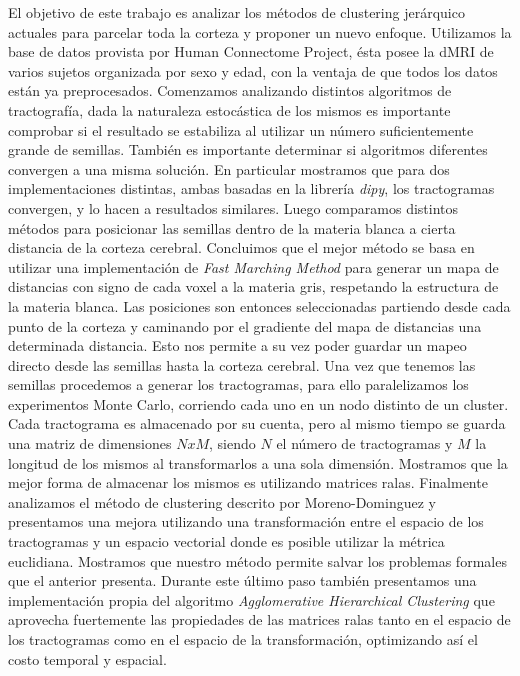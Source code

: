El objetivo de este trabajo es analizar los m\'etodos de clustering jer\'arquico
actuales para parcelar toda la corteza y proponer un nuevo enfoque. Utilizamos
la base de datos provista por Human Connectome Project, \'esta posee la dMRI de
varios sujetos organizada por sexo y edad, con la ventaja de que todos los datos
est\'an ya preprocesados. Comenzamos analizando distintos algoritmos de
tractograf\'ia, dada la naturaleza estoc\'astica de los mismos es importante
comprobar si el resultado se estabiliza al utilizar un n\'umero suficientemente
grande de semillas. Tambi\'en es importante determinar si algoritmos diferentes
convergen a una misma soluci\'on. En particular mostramos que para dos
implementaciones distintas, ambas basadas en la librer\'ia \textit{dipy}, los
tractogramas convergen, y lo hacen a resultados similares. Luego comparamos distintos 
m\'etodos para posicionar las semillas dentro de la materia blanca a cierta 
distancia de la corteza cerebral. Concluimos que el mejor m\'etodo se basa en 
utilizar una implementaci\'on de \textit{Fast Marching Method} para generar un
mapa de distancias con signo de cada voxel a la materia gris, respetando la estructura
de la materia blanca. Las posiciones son entonces seleccionadas partiendo desde
cada punto de la corteza y caminando por el gradiente del mapa de distancias una
determinada distancia. Esto nos permite a su vez poder guardar un mapeo directo
desde las semillas hasta la corteza cerebral. Una vez que tenemos las semillas
procedemos a generar los tractogramas, para ello paralelizamos los experimentos
Monte Carlo, corriendo cada uno en un nodo distinto de un cluster. Cada tractograma 
es almacenado por su cuenta, pero al mismo tiempo se guarda una matriz de 
dimensiones $NxM$, siendo $N$ el n\'umero de tractogramas y $M$ la longitud 
de los mismos al transformarlos a una sola dimensi\'on. Mostramos que la mejor
forma de almacenar los mismos es utilizando matrices ralas. Finalmente analizamos
el m\'etodo de clustering descrito por Moreno-Dominguez y presentamos una mejora 
utilizando una transformaci\'on entre el espacio de los tractogramas
y un espacio vectorial donde es posible utilizar la m\'etrica euclidiana. 
Mostramos que nuestro m\'etodo permite salvar los problemas formales que el
anterior presenta. Durante este \'ultimo paso tambi\'en presentamos una 
implementaci\'on propia del algoritmo \textit{Agglomerative Hierarchical
Clustering} que aprovecha fuertemente las propiedades de las matrices ralas tanto
en el espacio de los tractogramas como en el espacio de la transformaci\'on, 
optimizando as\'i el costo temporal y espacial.
